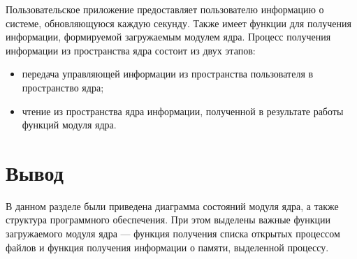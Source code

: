 Пользовательское  приложение  предоставляет  пользователю информацию  о  системе,  обновляющуюся  каждую  секунду. Также имеет функции для получения информации, формируемой загружаемым модулем ядра. Процесс получения информации из пространства ядра состоит из двух этапов: 

\begin{itemize}
    \item передача  управляющей  информации  из  пространства  пользователя  в 
    пространство ядра; 
    \item чтение  из  пространства  ядра  информации,  полученной  в  результате 
    работы функций модуля ядра. 
\end{itemize}


\section*{Вывод}

В данном разделе были приведена диаграмма состояний модуля ядра, а также структура программного обеспечения. При этом выделены важные функции загружаемого модуля ядра --- функция получения списка открытых процессом файлов и функция получения информации о памяти, выделенной процессу.
